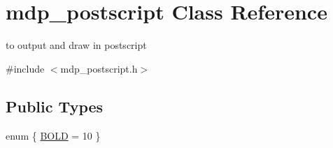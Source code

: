 \hypertarget{classmdp__postscript}{}\section{mdp\+\_\+postscript Class Reference}
\label{classmdp__postscript}


to output and draw in postscript  




{\ttfamily \#include $<$mdp\+\_\+postscript.\+h$>$}

\subsection*{Public Types}
\begin{DoxyCompactItemize}
\item 
enum \{ \hyperlink{classmdp__postscript_a9a7e58c0e001105f4fe6d86a0a11348fa8266db73d3c5c06b4c4e8fdb9c4c38c0}{B\+O\+LD} = 10
 \}
\end{DoxyCompactItemize}
